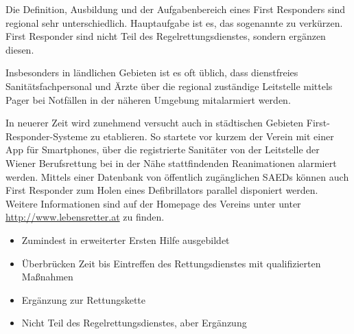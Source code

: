 {%
Die Definition, Ausbildung und der Aufgabenbereich eines First Responders sind regional sehr unterschiedlich. 
%
%
Hauptaufgabe ist es, 
das sogenannte  zu verkürzen. 
%
First Responder sind nicht Teil des Regelrettungsdienstes,
sondern ergänzen diesen. 
%

Insbesonders in ländlichen Gebieten ist es oft üblich, 
dass dienstfreies Sanitätsfachpersonal 
und Ärzte 
über die regional zuständige Leitstelle 
mittels Pager bei Notfällen in der näheren Umgebung mitalarmiert werden.
%

In neuerer Zeit wird zunehmend versucht 
auch in städtischen Gebieten First-Responder-Systeme zu etablieren. 
%
So startete vor kurzem der Verein  
mit einer App für Smartphones, 
über die registrierte Sanitäter 
von der Leitstelle 
der Wiener Berufsrettung 
bei in der Nähe stattfindenden Reanimationen alarmiert werden. 
%
Mittels einer Datenbank 
von öffentlich zugänglichen SAEDs 
können auch First Responder 
zum Holen eines Defibrillators 
parallel disponiert werden. 
%
Weitere Informationen sind auf der Homepage des Vereins unter unter \url{http://www.lebensretter.at} zu finden.
}{
\begin{itemize}
  \item Zumindest in erweiterter Ersten Hilfe ausgebildet
  \item Überbrücken Zeit bis Eintreffen des Rettungsdienstes mit qualifizierten Maßnahmen
  \item Ergänzung zur Rettungskette
  \item Nicht Teil des Regelrettungsdienstes, aber Ergänzung
\end{itemize}
}



